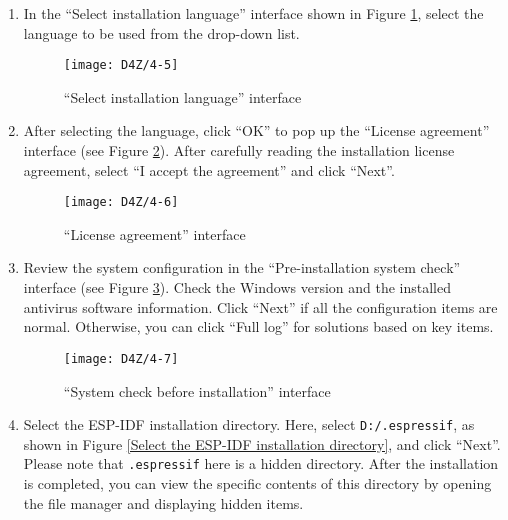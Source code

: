\documentclass[a4paper,12pt]{book}
\begin{document}
\begin{enumerate}[label=(\arabic*)]
    \item In the “Select installation language” interface shown in Figure \ref{“Select installation language” interface}, select the language to be used from the drop-down list.

    \begin{figure}[h!]
        \centering
        \texttt{[image: D4Z/4-5]}
        \caption{“Select installation language” interface}
        \label{“Select installation language” interface}
    \end{figure}

    \item After selecting the language, click “OK” to pop up the “License agreement” interface (see Figure \ref{“License agreement” interface}). After carefully reading the installation license agreement, select “I accept the agreement” and click “Next”.

    \begin{figure}[h!]
        \centering
        \texttt{[image: D4Z/4-6]}
        \caption{“License agreement” interface}
        \label{“License agreement” interface}
    \end{figure}

    \item Review the system configuration in the “Pre-installation system check” interface (see Figure \ref{“System check before installation” interface}). Check the Windows version and the installed antivirus software information. Click “Next” if all the configuration items are normal. Otherwise, you can click “Full log” for solutions based on key items.

    \begin{figure}[h!]
        \centering
        \texttt{[image: D4Z/4-7]}
        \caption{“System check before installation” interface}
        \label{“System check before installation” interface}
    \end{figure}


    \item Select the ESP-IDF installation directory. Here, select \verb|D:/.espressif|, as shown in Figure \ref{Select the ESP-IDF installation directory}, and click “Next”. Please note that \verb|.espressif| here is a hidden directory. After the installation is completed, you can view the specific contents of this directory by opening the file manager and displaying hidden items.


\end{enumerate}
\end{document}

